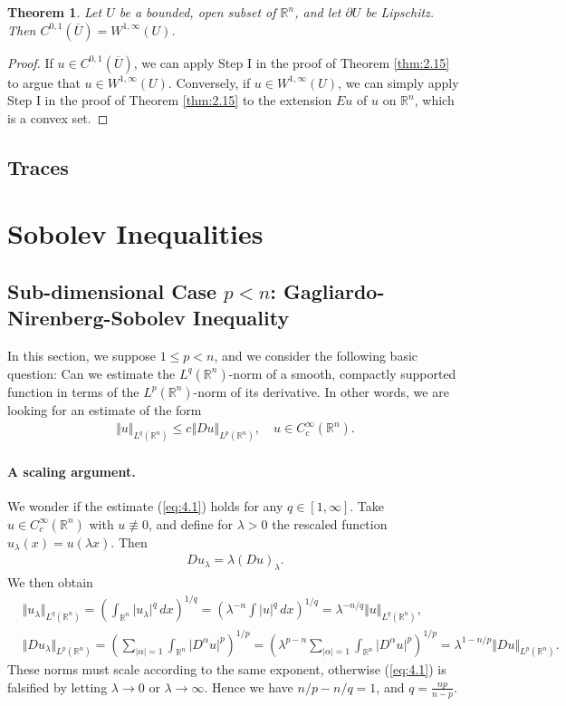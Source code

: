 \documentclass{article}
\numberwithin{equation}{section}
\newcommand{\bbR}{\mathbb{R}}
\newcommand{\ol}{\overline}
\theoremstyle{plain}
\newtheorem{theorem}{Theorem}[section]
\theoremstyle{definition}
\begin{document}
\begin{theorem}\label{thm:3.2}
Let $U$ be a bounded, open subset of $\bbR^n$, and let $\partial U$ be Lipschitz. Then $C^{0,1}(\ol{U})=W^{1,\infty}(U)$.
\end{theorem}
\begin{proof}
If $u\in C^{0,1}(\ol{U})$, we can apply Step I in the proof of Theorem \ref{thm:2.15} to argue that $u\in W^{1,\infty}(U)$. Conversely, if $u\in W^{1,\infty}(U)$, we can simply apply Step I in the proof of Theorem \ref{thm:2.15} to the extension $Eu$ of $u$ on $\bbR^n$, which is a convex set.
\end{proof}

\subsection{Traces}

\newpage
\section{Sobolev Inequalities}
\subsection{Sub-dimensional Case $p<n$: Gagliardo-Nirenberg-Sobolev Inequality}
In this section, we suppose $1\leq p <n$, and we consider the following basic question: Can we estimate the $L^q(\bbR^n)$-norm of a smooth, compactly supported function in terms of the $L^p(\bbR^n)$-norm of its derivative. In other words, we are looking for an estimate of the form
\begin{align}
	\Vert u\Vert_{L^q(\bbR^n)}\leq c\Vert Du\Vert_{L^p(\bbR^n)},\quad u\in C_c^\infty(\bbR^n).\label{eq:4.1}
\end{align}
\paragraph{A scaling argument.} We wonder if the estimate (\ref{eq:4.1}) holds for any $q\in[1,\infty]$. Take $u\in C_c^\infty(\bbR^n)$ with $u\not\equiv 0$, and define for $\lambda>0$ the rescaled function $u_\lambda(x)=u(\lambda x)$. Then
\begin{align*}
	Du_\lambda=\lambda(Du)_\lambda.
\end{align*}
We then obtain
\begin{align*}
	&\Vert u_\lambda\Vert_{L^q(\bbR^n)}=\left(\int_{\bbR^n}\vert u_\lambda\vert^q\,dx\right)^{1/q}=\left(\lambda^{-n}\int\vert u\vert^q\,dx\right)^{1/q}=\lambda^{-n/q}\Vert u\Vert_{L^q(\bbR^n)},\\
	&\Vert Du_\lambda\Vert_{L^p(\bbR^n)}=\left(\sum_{\vert\alpha\vert=1}\int_{\bbR^n}\vert D^\alpha u\vert^p\right)^{1/p}=\left(\lambda^{p-n}\sum_{\vert\alpha\vert=1}\int_{\bbR^n}\vert D^\alpha u\vert^p\right)^{1/p}=\lambda^{1-n/p}\Vert Du\Vert_{L^p(\bbR^n)}.
\end{align*}
These norms must scale according to the same exponent, otherwise (\ref{eq:4.1}) is falsified by letting $\lambda\to 0$ or $\lambda\to\infty$. Hence we have $n/p-n/q=1$, and $q=\frac{np}{n-p}$.
\end{document}
